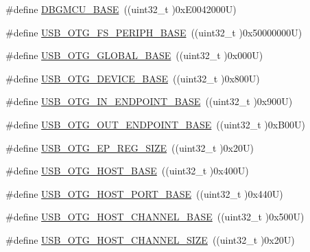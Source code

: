 \begin{DoxyCompactItemize}
\item 
\#define \hyperlink{group___peripheral__registers__structures_ga4adaf4fd82ccc3a538f1f27a70cdbbef}{D\+B\+G\+M\+C\+U\+\_\+\+B\+A\+SE}~((uint32\+\_\+t )0x\+E0042000\+U)
\item 
\#define \hyperlink{group___peripheral__registers__structures_gaa86d4c80849a74938924e73937b904e7}{U\+S\+B\+\_\+\+O\+T\+G\+\_\+\+F\+S\+\_\+\+P\+E\+R\+I\+P\+H\+\_\+\+B\+A\+SE}~((uint32\+\_\+t )0x50000000\+U)
\item 
\#define \hyperlink{group___peripheral__registers__structures_ga044aa4388e72d9d47a03f387fb8926fb}{U\+S\+B\+\_\+\+O\+T\+G\+\_\+\+G\+L\+O\+B\+A\+L\+\_\+\+B\+A\+SE}~((uint32\+\_\+t )0x000\+U)
\item 
\#define \hyperlink{group___peripheral__registers__structures_ga4d74a337597a77b1fca978202b519a18}{U\+S\+B\+\_\+\+O\+T\+G\+\_\+\+D\+E\+V\+I\+C\+E\+\_\+\+B\+A\+SE}~((uint32\+\_\+t )0x800\+U)
\item 
\#define \hyperlink{group___peripheral__registers__structures_gad8f69041452615aeb3948600e3882246}{U\+S\+B\+\_\+\+O\+T\+G\+\_\+\+I\+N\+\_\+\+E\+N\+D\+P\+O\+I\+N\+T\+\_\+\+B\+A\+SE}~((uint32\+\_\+t )0x900\+U)
\item 
\#define \hyperlink{group___peripheral__registers__structures_gaf0e972b8f028ecf44a652029efbd4642}{U\+S\+B\+\_\+\+O\+T\+G\+\_\+\+O\+U\+T\+\_\+\+E\+N\+D\+P\+O\+I\+N\+T\+\_\+\+B\+A\+SE}~((uint32\+\_\+t )0x\+B00\+U)
\item 
\#define \hyperlink{group___peripheral__registers__structures_ga6fdb7429ad88e2d69440d6ecc4f4199e}{U\+S\+B\+\_\+\+O\+T\+G\+\_\+\+E\+P\+\_\+\+R\+E\+G\+\_\+\+S\+I\+ZE}~((uint32\+\_\+t )0x20\+U)
\item 
\#define \hyperlink{group___peripheral__registers__structures_ga3bb2dd6c82eefd8587b6146ba36ae071}{U\+S\+B\+\_\+\+O\+T\+G\+\_\+\+H\+O\+S\+T\+\_\+\+B\+A\+SE}~((uint32\+\_\+t )0x400\+U)
\item 
\#define \hyperlink{group___peripheral__registers__structures_ga42f433cb79ca69f09972e690fda6737a}{U\+S\+B\+\_\+\+O\+T\+G\+\_\+\+H\+O\+S\+T\+\_\+\+P\+O\+R\+T\+\_\+\+B\+A\+SE}~((uint32\+\_\+t )0x440\+U)
\item 
\#define \hyperlink{group___peripheral__registers__structures_ga942c8c5241b80fbcf638fea0fa18bebd}{U\+S\+B\+\_\+\+O\+T\+G\+\_\+\+H\+O\+S\+T\+\_\+\+C\+H\+A\+N\+N\+E\+L\+\_\+\+B\+A\+SE}~((uint32\+\_\+t )0x500\+U)
\item 
\#define \hyperlink{group___peripheral__registers__structures_ga266cb1dbb50faf447f9c15d2ee93a522}{U\+S\+B\+\_\+\+O\+T\+G\+\_\+\+H\+O\+S\+T\+\_\+\+C\+H\+A\+N\+N\+E\+L\+\_\+\+S\+I\+ZE}~((uint32\+\_\+t )0x20\+U)

\end{DoxyCompactItemize}
